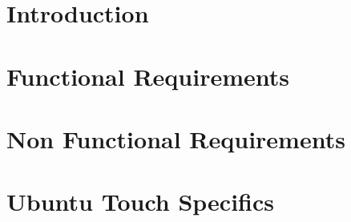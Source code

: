 



\chapter{Introduction}












\chapter{Functional Requirements}









\newpage


\chapter{Non Functional Requirements}





\chapter{Ubuntu Touch Specifics}







%



